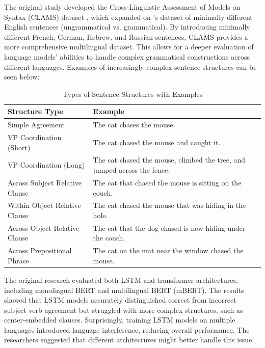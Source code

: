 \documentclass[11pt]{article}
\begin{document}
The original study developed the Cross-Linguistic Assessment of Models on Syntax (CLAMS) dataset \cite{clams}, which expanded on \cite{Marvin2018TargetedSE}'s dataset of minimally different English sentences (ungrammatical vs. grammatical). By introducing minimally different French, German, Hebrew, and Russian sentences, CLAMS provides a more comprehensive multilingual dataset. This allows for a deeper evaluation of language models’ abilities to handle complex grammatical constructions across different languages. Examples of increasingly complex sentence structures can be seen below:

\begin{table}[h!]
\centering
\small %
\setlength{\tabcolsep}{3pt} %
\renewcommand{\arraystretch}{1.1} %
\begin{tabular}{p{3.5cm}p{5.5cm}} %
\toprule
\textbf{Structure Type} & \textbf{Example} \\ 
\midrule
Simple Agreement & The cat chases the mouse. \\ 
VP Coordination (Short) & The cat chased the mouse and caught it. \\ 
VP Coordination (Long) & The cat chased the mouse, climbed the tree, and jumped across the fence. \\ 
Across Subject Relative Clause & The cat that chased the mouse is sitting on the couch. \\ 
Within Object Relative Clause & The cat chased the mouse that was hiding in the hole. \\ 
Across Object Relative Clause & The cat that the dog chased is now hiding under the couch. \\ 
Across Prepositional Phrase & The cat on the mat near the window chased the mouse. \\ 
\bottomrule
\end{tabular}
\label{tab:Table1}
\caption{Types of Sentence Structures with Examples}
\end{table}


The original research evaluated both LSTM and transformer architectures, including monolingual BERT and multilingual BERT (mBERT). The results showed that LSTM models accurately distinguished correct from incorrect subject-verb agreement but struggled with more complex structures, such as center-embedded clauses. Surprisingly, training LSTM models on multiple languages introduced language interference, reducing overall performance. The researchers suggested that different architectures might better handle this issue.
\end{document}
